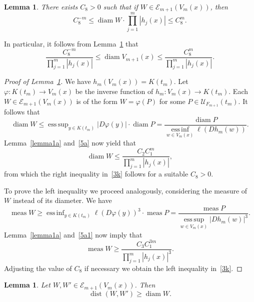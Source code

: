\documentclass[12pt,a4paper]{amsart}
\theoremstyle{plain}
\newtheorem{lemma}[theorem]{Lemma}
\theoremstyle{definition}
\theoremstyle{remark}
\newcommand{\diam}{\operatorname{diam}}
\DeclareMathOperator*{\esssup}{ess\,sup}
\DeclareMathOperator*{\essinf}{ess\,inf}
\def\cE{\mathcal E}
\def\cU{\mathcal U}
\def\dist{\operatorname{dist}}
\def\meas{\operatorname{meas}}
\numberwithin{equation}{section}
\begin{document}
\begin{lemma} \label{lemma5}
There exists $C_8>0$ such that if $W\in\cE_{m+1}(V_m(x))$, then
\begin{equation}\label{3k}
C_8^{-m}\leq \diam W \cdot \prod_{j=1}^{m}|h_j(x)| \leq C_8^m .
\end{equation}
\end{lemma}
In particular, it follows from Lemma~\ref{lemma5} that
\begin{equation}\label{3j}
\frac{C_8^{-m}}{\prod_{j=1}^{m}|h_j(x)|}\leq
\diam V_{m+1}(x) \leq  \frac{C_8^{m}}{\prod_{j=1}^{m}|h_j(x)|} .
\end{equation}
\begin{proof}[Proof of Lemma~\ref{lemma5}]
We have $h_m(V_m(x))=K(t_m)$. Let $\varphi\colon K(t_m)\to V_m(x)$ be the inverse function 
of $h_m\colon V_m(x)\to K(t_m)$. Each $W\in \cE_{m+1}(V_m(x))$ is of the form
$W=\varphi(P)$ for some $P\in\cU_{F_{m+1}}(t_m)$.
It follows that 
\begin{equation}\label{5p}
\diam W\leq \esssup_{y\in K(t_m)}|D\varphi(y)|\cdot \diam P
=\frac{\diam P}{\essinf\limits_{w\in V_m(x)}\ell(Dh_m(w))} .
\end{equation}
Lemma~\ref{lemma1a} and~\eqref{5a} now yield that
\begin{equation}\label{5u}
\diam W\leq  \frac{C_2C_1^m}{\prod_{j=1}^m |h_{j}(x)|},
\end{equation}
from which the right inequality in~\eqref{3k} follows
for a suitable $C_8>0$.

To prove the left inequality we proceed analogously, considering the measure of~$W$
instead of its diameter. We have
\begin{equation}\label{5p1}
\meas W\geq \essinf_{y\in K(t_m)}\ell(D\varphi(y))^3\cdot \meas P
=\frac{\meas P}{\esssup\limits_{w\in V_m(x)}|Dh_m(w)|^3} .
\end{equation}
Lemma~\ref{lemma1a} and~\eqref{5a1} now imply that
\begin{equation}\label{5u1}
\meas W\geq  \frac{C_3C_1^{3m}}{\prod_{j=1}^m |h_{j}(x)|^3}.
\end{equation}
Adjusting the value of $C_8$ if necessary we obtain the left inequality in~\eqref{3k}.
\end{proof}
\begin{lemma} \label{lemma6}
Let $W,W'\in \cE_{m+1}(V_{m}(x))$. Then
\begin{equation}\label{3l}
\dist(W,W')\geq \diam W.
\end{equation}
\end{lemma}
\end{document}
